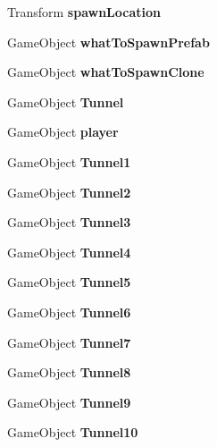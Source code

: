 \begin{DoxyCompactItemize}
\item 
\mbox{\label{classspawner_a26b58cb9f3075eb85000edcff0e7fba6}} 
Transform {\bfseries spawn\+Location}
\item 
\mbox{\label{classspawner_a3c9d912ff6d5cc8c9b9fe7cbc6a3e8ec}} 
Game\+Object {\bfseries what\+To\+Spawn\+Prefab}
\item 
\mbox{\label{classspawner_a4a6919b1060c8a72eddcdc07f1883ba1}} 
Game\+Object {\bfseries what\+To\+Spawn\+Clone}
\item 
\mbox{\label{classspawner_ab7dfbff2bfaa00d0b045f4bf022c7995}} 
Game\+Object {\bfseries Tunnel}
\item 
\mbox{\label{classspawner_a89e77842cc7f33c46321a75f44055a75}} 
Game\+Object {\bfseries player}
\item 
\mbox{\label{classspawner_af9a54f36ab8f743d855674b3cfcd4dd1}} 
Game\+Object {\bfseries Tunnel1}
\item 
\mbox{\label{classspawner_a7eebd29728355bb993c8d5cd888410f8}} 
Game\+Object {\bfseries Tunnel2}
\item 
\mbox{\label{classspawner_a0a2bd624eb7be9623e729cfd1ca9337e}} 
Game\+Object {\bfseries Tunnel3}
\item 
\mbox{\label{classspawner_abd95f08c421473fd9c69b8f8fd79cc21}} 
Game\+Object {\bfseries Tunnel4}
\item 
\mbox{\label{classspawner_ae528e3b512785518710e2d40003f0c86}} 
Game\+Object {\bfseries Tunnel5}
\item 
\mbox{\label{classspawner_ac73acc4e61098de59bf9890e3e4f5d6b}} 
Game\+Object {\bfseries Tunnel6}
\item 
\mbox{\label{classspawner_a23b537bd7e61b6048b1873c0f807246d}} 
Game\+Object {\bfseries Tunnel7}
\item 
\mbox{\label{classspawner_a92ae2cb494a755b9e86a6e14d5d55822}} 
Game\+Object {\bfseries Tunnel8}
\item 
\mbox{\label{classspawner_af11fe3baada1beb0e97f190ea8072c9e}} 
Game\+Object {\bfseries Tunnel9}
\item 
\mbox{\label{classspawner_a33dcfe223582a0f084e9fe06c44088c3}} 
Game\+Object {\bfseries Tunnel10}
\end{DoxyCompactItemize}
